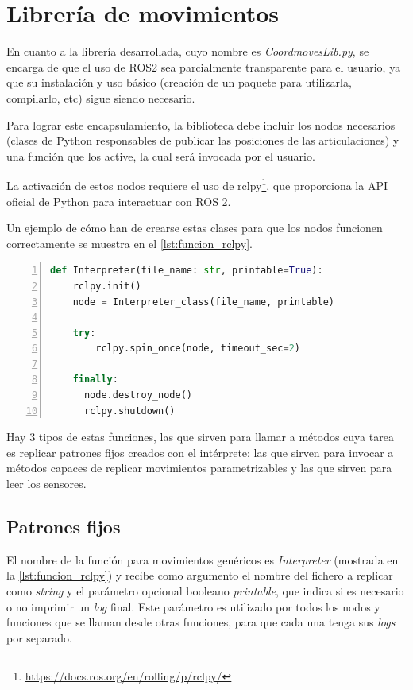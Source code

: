 \section{Librería de movimientos} \label{sec:librería}

En cuanto a la librería desarrollada, cuyo nombre es \textit{CoordmovesLib.py}, se encarga de que el uso de ROS2 sea parcialmente transparente para el usuario, ya que su instalación y uso básico (creación de un paquete para utilizarla, compilarlo, etc) sigue siendo necesario.

Para lograr este encapsulamiento, la biblioteca debe incluir los nodos necesarios (clases de Python responsables de publicar las posiciones de las articulaciones) y una función que los active, la cual será invocada por el usuario.

La activación de estos nodos requiere el uso de rclpy\footnote{\url{https://docs.ros.org/en/rolling/p/rclpy/}}, que proporciona la API oficial de Python para interactuar con ROS 2.

Un ejemplo de cómo han de crearse estas clases para que los nodos funcionen correctamente se muestra en el \autoref{lst:funcion_rclpy}.

\begin{lstlisting}[language=Python, caption={Ejemplo de función que invoca un nodo ROS2}, label={lst:funcion_rclpy}, numbers=left, backgroundcolor=\color{gray!10}]    
def Interpreter(file_name: str, printable=True):
    rclpy.init()
    node = Interpreter_class(file_name, printable)
    
    try:
        rclpy.spin_once(node, timeout_sec=2)
    
    finally:
      node.destroy_node()
      rclpy.shutdown()
\end{lstlisting}

Hay 3 tipos de estas funciones, las que sirven para llamar a métodos cuya tarea es replicar patrones fijos creados con el intérprete; las que sirven para invocar a métodos capaces de replicar movimientos parametrizables y las que sirven para leer los sensores.

\subsection{Patrones fijos}

El nombre de la función para movimientos genéricos es \textit{Interpreter} (mostrada en la \autoref{lst:funcion_rclpy}) y recibe como argumento el nombre del fichero a replicar como \textit{string} y el parámetro opcional booleano \textit{printable}, que indica si es necesario o no imprimir un \textit{log} final. Este parámetro es utilizado por todos los nodos y funciones que se llaman desde otras funciones, para que cada una tenga sus \textit{logs} por separado. 

